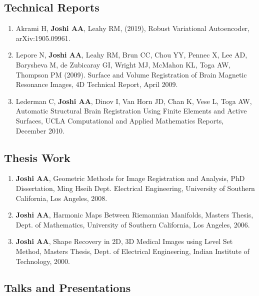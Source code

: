 \documentclass[overlapped,line,letterpaper]{res}
\begin{document}
\begin{resume}
\subsection{Technical Reports}
\begin{enumerate}

    \item Akrami H, \textbf{Joshi AA}, Leahy RM, (2019), Robust Variational Autoencoder, arXiv:1905.09961.
    
    \item Lepore N, \textbf{Joshi AA}, Leahy RM, Brun CC, Chou YY, Pennec X, Lee AD, Barysheva M, de Zubicaray GI, Wright MJ, McMahon KL, Toga AW, Thompson PM (2009). Surface and Volume Registration of Brain Magnetic Resonance Images, 4D Technical Report, April 2009.

    \item Lederman C, \textbf{Joshi AA}, Dinov I, Van Horn JD, Chan K, Vese L, Toga AW, Automatic Structural Brain Registration Using Finite Elements and Active Surfaces, UCLA Computational and Applied Mathematics Reports, December 2010. 

\end{enumerate}


\subsection{Thesis Work}
\begin{enumerate}
    \item \textbf{Joshi AA}, Geometric Methods for Image Registration and Analysis, PhD Dissertation, Ming Hseih Dept. Electrical Engineering, University of Southern California, Los Angeles, 2008.

    \item \textbf{Joshi AA}, Harmonic Maps Between Riemannian Manifolds, Masters Thesis, Dept. of Mathematics, University of Southern California, Los Angeles, 2006.

    \item \textbf{Joshi AA}, Shape Recovery in 2D, 3D Medical Images using Level Set Method, Masters Thesis, Dept. of Electrical Engineering, Indian Institute of Technology, 2000.

\end{enumerate}

\subsection{Talks and Presentations}
\begin{enumerate}


\end{enumerate}
\end{resume}
\end{document}
